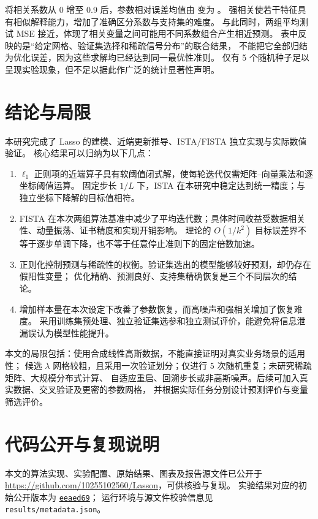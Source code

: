 \documentclass[UTF8,11pt,a4paper,fontset=fandol]{ctexart}
\begin{document}
将相关系数从 0 增至 0.9 后，参数相对误差均值由 \BaseErrorMean{} 变为 \ErrorHighCorrelation{}。
强相关使若干特征具有相似解释能力，增加了准确区分系数与支持集的难度。
与此同时，两组平均测试 MSE 接近，体现了相关变量之间可能用不同系数组合产生相近预测。
表中反映的是“给定网格、验证集选择和稀疏信号分布”的联合结果，
不能把它全部归结为优化误差，因为这些求解均已经达到同一最优性准则。
仅有 5 个随机种子足以呈现实验现象，但不足以据此作广泛的统计显著性声明。
\FloatBarrier

\section{结论与局限}
本研究完成了 Lasso 的建模、近端更新推导、ISTA/FISTA 独立实现与实际数值验证。
核心结果可以归纳为以下几点：
\begin{enumerate}
\item $\ell_1$ 正则项的近端算子具有软阈值闭式解，使每轮迭代仅需矩阵--向量乘法和逐坐标阈值运算。
固定步长 $1/L$ 下，ISTA 在本研究中稳定达到统一精度；与独立坐标下降解的目标值相符。
\item FISTA 在本次两组算法基准中减少了平均迭代数；具体时间收益受数据相关性、动量振荡、证书精度和实现开销影响。
理论的 $O(1/k^2)$ 目标误差界不等于逐步单调下降，也不等于任意停止准则下的固定倍数加速。
\item 正则化控制预测与稀疏性的权衡。验证集选出的模型能够较好预测，却仍存在假阳性变量；
优化精确、预测良好、支持集精确恢复是三个不同层次的结论。
\item 增加样本量在本次设定下改善了参数恢复，而高噪声和强相关增加了恢复难度。
采用训练集预处理、独立验证集选参和独立测试评价，能避免将信息泄漏误认为模型性能提升。
\end{enumerate}

本文的局限包括：使用合成线性高斯数据，不能直接证明对真实业务场景的适用性；
候选 $\lambda$ 网格较粗，且采用一次验证划分；仅进行 5 次随机重复；未研究稀疏矩阵、大规模分布式计算、
自适应重启、回溯步长或非高斯噪声。后续可加入真实数据、交叉验证及更密的参数网格，
并根据实际任务分别设计预测评价与变量筛选评价。

\appendix
\section{代码公开与复现说明}
本文的算法实现、实验配置、原始结果、图表及报告源文件已公开于
\url{https://github.com/10255102560/Lasson}，可供核验与复现。
实验结果对应的初始公开版本为
\href{https://github.com/10255102560/Lasson/commit/eeaed69b0accff24bd4aac847baed2e1798f91ef}{\texttt{eeaed69}}；
运行环境与源文件校验信息见 \texttt{results/metadata.json}。
\end{document}
